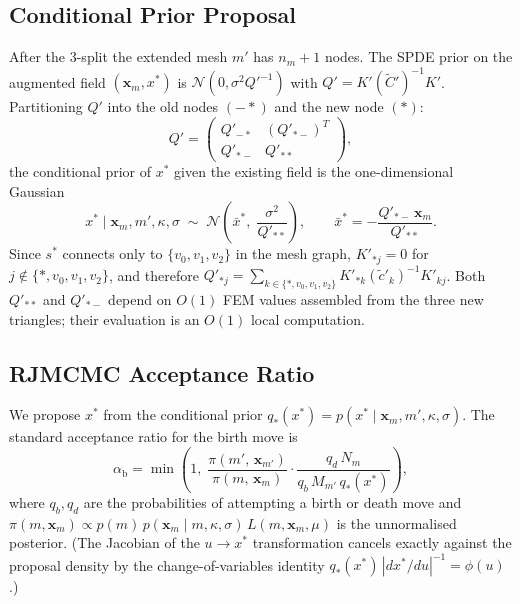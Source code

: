 \documentclass[11pt]{article}
\begin{document}
\subsection{Conditional Prior Proposal}
\label{sec:rj-proposal}

After the 3-split the extended mesh $m'$ has $n_m+1$ nodes.  The SPDE prior
on the augmented field $(\mathbf{x}_m,x^*)$ is
$\mathcal{N}(0,\sigma^2 Q'^{-1})$ with $Q'=K'(\tilde{C}')^{-1}K'$.
Partitioning $Q'$ into the old nodes $(-*)$ and the new node $(*)$:
\begin{equation}
  Q' = \begin{pmatrix} Q'_{-*} & (Q'_{*-})^T \\ Q'_{*-} & Q'_{**} \end{pmatrix},
\end{equation}
the conditional prior of $x^*$ given the existing field is the
one-dimensional Gaussian
\begin{equation}
  x^*\mid\mathbf{x}_m,m',\kappa,\sigma
  \;\sim\; \mathcal{N}\!\left(\bar{x}^*,\;\frac{\sigma^2}{Q'_{**}}\right),
  \qquad
  \bar{x}^* = -\frac{Q'_{*-}\,\mathbf{x}_m}{Q'_{**}}.
  \label{eq:cond-prior-rj}
\end{equation}
Since $s^*$ connects only to $\{v_0,v_1,v_2\}$ in the mesh graph,
$K'_{*j}=0$ for $j\notin\{*,v_0,v_1,v_2\}$, and therefore
$Q'_{*j} = \sum_{k\in\{*,v_0,v_1,v_2\}} K'_{*k}(\tilde{c}'_k)^{-1}K'_{kj}$.
Both $Q'_{**}$ and $Q'_{*-}$ depend on $O(1)$ FEM values assembled from the
three new triangles; their evaluation is an $O(1)$ local computation.

\subsection{RJMCMC Acceptance Ratio}
\label{sec:rj-acceptance}

We propose $x^*$ from the conditional prior $q_*(x^*)=p(x^*\mid\mathbf{x}_m,m',\kappa,\sigma)$.
The standard \citet{green1995} acceptance ratio for the birth move is
\begin{equation}
  \alpha_\mathrm{b} = \min\!\left(1,\;
    \frac{\pi(m',\,\mathbf{x}_{m'})}
         {\pi(m,\,\mathbf{x}_m)}\cdot
    \frac{q_d\,N_m}{q_b\,M_{m'}\,q_*(x^*)}
  \right),
  \label{eq:rj-raw}
\end{equation}
where $q_b,q_d$ are the probabilities of attempting a birth or death move and
$\pi(m,\mathbf{x}_m)\propto p(m)\,p(\mathbf{x}_m\mid m,\kappa,\sigma)\,L(m,\mathbf{x}_m,\mu)$
is the unnormalised posterior.  (The Jacobian of the $u\to x^*$ transformation
cancels exactly against the proposal density by the change-of-variables
identity $q_*(x^*)\,|dx^*/du|^{-1}=\phi(u)$.)
\end{document}
